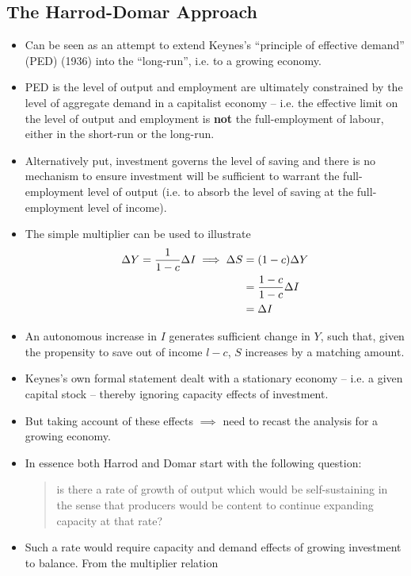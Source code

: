\documentclass{article}
\begin{document}
\subsection{The Harrod-Domar Approach}
	\begin{itemize}
		\item Can be seen as an attempt to extend Keynes's ``principle of effective demand'' (PED) (1936) into the ``long-run'', i.e. to a growing economy. 
		\item PED is the level of output and employment are ultimately constrained by the level of aggregate demand in a capitalist economy -- i.e. the effective limit on the level of output and employment is \textbf{\textbf{not}} the full-employment of labour, either in the short-run or the long-run.
		\item Alternatively put, investment governs the level of saving and there is no mechanism to ensure investment will be sufficient to warrant the full-employment level of output (i.e. to absorb the level of saving at the full-employment level of income).
		\item The simple multiplier can be used to illustrate
		\begin{align}
			\Delta Y = \frac{1}{1-c} \Delta I \implies \Delta S &= (1-c) \Delta Y\\ \notag
																&= \frac{1-c}{1-c} \Delta I\\ \notag
																&= \Delta I \label{eq:2.3}
		\end{align}
		\item An autonomous increase in \( I \) generates sufficient change in \( Y \), such that, given the propensity to save out of income \( l-c \), \( S \) increases by a matching amount. 
		\item Keynes's own formal statement dealt with a stationary economy -- i.e. a given capital stock -- thereby ignoring capacity effects of investment. 
		\item But taking account of these effects \( \implies \) need to recast the analysis for a growing economy.
		\item In essence both Harrod and Domar start with the following question: 
		\begin{quote}
			is there a rate of growth of output which would be self-sustaining in the sense that producers would be content to continue expanding capacity at that rate?
		\end{quote}
		\item Such a rate would require capacity and demand effects of growing investment to balance. From the multiplier relation

\end{itemize}
\end{document}
